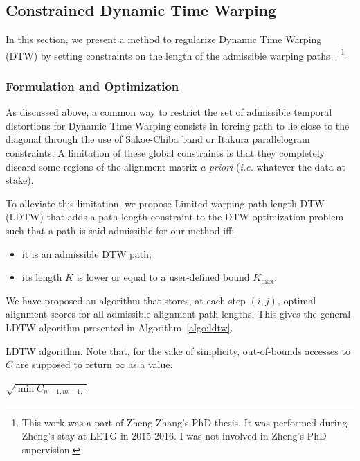\subsection{Constrained Dynamic Time Warping}

In this section, we present a method to regularize Dynamic Time Warping (DTW)
by setting constraints on the length of the admissible warping
paths~\cite{zhang2017dynamic}.%
\footnote{This work was a part of Zheng Zhang's PhD thesis. It was performed
during Zheng's stay at LETG in 2015-2016.
I was not involved in Zheng's PhD supervision.}

\subsubsection{Formulation and Optimization}

As discussed above, a common way
to restrict the set of admissible temporal distortions for Dynamic Time Warping
consists in forcing path to lie close to the diagonal through the use of
Sakoe-Chiba band or Itakura parallelogram constraints.
A limitation of these global constraints is that they completely
discard some regions of the alignment matrix \emph{a priori} (\emph{i.e.} whatever the
data at stake).

To alleviate this limitation, we propose Limited warping path length DTW (LDTW)
that adds a path length constraint to the DTW
optimization problem such that a path is said admissible for our method iff:

\begin{itemize}
\item it is an admissible DTW path;
\item its length $K$ is lower or equal to a user-defined bound $K_\text{max}$.
\end{itemize}

We have proposed an algorithm that stores, at each step $(i, j)$, optimal
alignment scores for all admissible alignment path lengths.
This gives the general LDTW algorithm presented in Algorithm~\ref{algo:ldtw}.

\begin{algorithm}[t]
 \caption{LDTW algorithm. Note that, for the sake of simplicity, out-of-bounds accesses to $C$ are supposed to return $\infty$ as a value.}
 \label{algo:ldtw}
  \Return $\sqrt{\min{C_{n - 1, m - 1, :}}}$
\end{algorithm}


